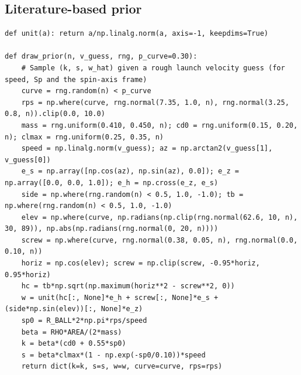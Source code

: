 \subsection*{Literature-based prior}
\begin{lstlisting}[style=mypython,basicstyle=\ttfamily\scriptsize]
def unit(a): return a/np.linalg.norm(a, axis=-1, keepdims=True)

def draw_prior(n, v_guess, rng, p_curve=0.30):
    # Sample (k, s, w_hat) given a rough launch velocity guess (for speed, Sp and the spin-axis frame)
    curve = rng.random(n) < p_curve
    rps = np.where(curve, rng.normal(7.35, 1.0, n), rng.normal(3.25, 0.8, n)).clip(0.0, 10.0)
    mass = rng.uniform(0.410, 0.450, n); cd0 = rng.uniform(0.15, 0.20, n); clmax = rng.uniform(0.25, 0.35, n)
    speed = np.linalg.norm(v_guess); az = np.arctan2(v_guess[1], v_guess[0])
    e_s = np.array([np.cos(az), np.sin(az), 0.0]); e_z = np.array([0.0, 0.0, 1.0]); e_h = np.cross(e_z, e_s)
    side = np.where(rng.random(n) < 0.5, 1.0, -1.0); tb = np.where(rng.random(n) < 0.5, 1.0, -1.0)
    elev = np.where(curve, np.radians(np.clip(rng.normal(62.6, 10, n), 30, 89)), np.abs(np.radians(rng.normal(0, 20, n))))
    screw = np.where(curve, rng.normal(0.38, 0.05, n), rng.normal(0.0, 0.10, n))
    horiz = np.cos(elev); screw = np.clip(screw, -0.95*horiz, 0.95*horiz)
    hc = tb*np.sqrt(np.maximum(horiz**2 - screw**2, 0))
    w = unit(hc[:, None]*e_h + screw[:, None]*e_s + (side*np.sin(elev))[:, None]*e_z)
    sp0 = R_BALL*2*np.pi*rps/speed
    beta = RHO*AREA/(2*mass)
    k = beta*(cd0 + 0.55*sp0)
    s = beta*clmax*(1 - np.exp(-sp0/0.10))*speed
    return dict(k=k, s=s, w=w, curve=curve, rps=rps)
\end{lstlisting}
